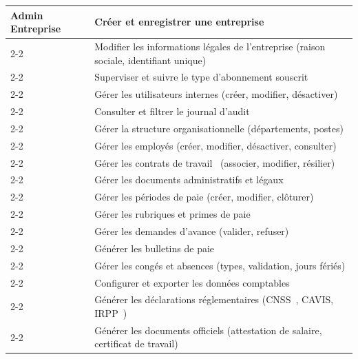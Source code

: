 \begin{longtable}{|p{3.5cm}|p{\dimexpr\linewidth-3.5cm-4\tabcolsep-2\arrayrulewidth}|}
\textbf{Admin Entreprise}
    & Créer et enregistrer une entreprise \\ \cline{2-2}
    & Modifier les informations légales de l'entreprise (raison sociale, identifiant unique) \\ \cline{2-2}
    & Superviser et suivre le type d'abonnement souscrit \\ \cline{2-2}
    & Gérer les utilisateurs internes (créer, modifier, désactiver) \\ \cline{2-2}
    & Consulter et filtrer le journal d'audit \\ \cline{2-2}
    & Gérer la structure organisationnelle (départements, postes) \\ \cline{2-2}
    & Gérer les employés (créer, modifier, désactiver, consulter) \\ \cline{2-2}
    & Gérer les contrats de travail~\cite{cdt} (associer, modifier, résilier) \\ \cline{2-2}
    & Gérer les documents administratifs et légaux \\ \cline{2-2}
    & Gérer les périodes de paie (créer, modifier, clôturer) \\ \cline{2-2}
    & Gérer les rubriques et primes de paie \\ \cline{2-2}
    & Gérer les demandes d'avance (valider, refuser) \\ \cline{2-2}
    & Générer les bulletins de paie~\cite{loifinance} \\ \cline{2-2}
    & Gérer les congés et absences (types, validation, jours fériés) \\ \cline{2-2}
    & Configurer et exporter les données comptables \\ \cline{2-2}
    & Générer les déclarations réglementaires (CNSS~\cite{cnss_reg}, CAVIS, IRPP~\cite{loifinance}) \\ \cline{2-2}
    & Générer les documents officiels (attestation de salaire, certificat de travail) \\ \hline


\end{longtable}
